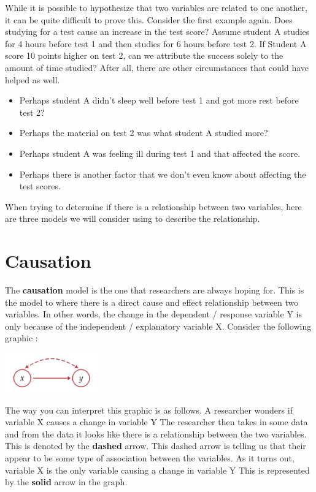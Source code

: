 \documentclass[
  letterpaper,
  DIV=11,
  numbers=noendperiod]{scrreprt}
\providecommand{\tightlist}{%
  \setlength{\itemsep}{0pt}\setlength{\parskip}{0pt}}\usepackage{longtable,booktabs,array}
\begin{document}
While it is possible to hypothesize that two variables are related to
one another, it can be quite difficult to prove this. Consider the first
example again. Does studying for a test cause an increase in the test
score? Assume student A studies for 4 hours before test 1 and then
studies for 6 hours before test 2. If Student A score 10 points higher
on test 2, can we attribute the success solely to the amount of time
studied? After all, there are other circumstances that could have helped
as well.

\begin{itemize}
\tightlist
\item
  Perhaps student A didn't sleep well before test 1 and got more rest
  before test 2?
\item
  Perhaps the material on test 2 was what student A studied more?
\item
  Perhaps student A was feeling ill during test 1 and that affected the
  score.
\item
  Perhaps there is another factor that we don't even know about
  affecting the test scores.
\end{itemize}

When trying to determine if there is a relationship between two
variables, here are three models we will consider using to describe the
relationship.

\section*{Causation}\label{causation}


The \textbf{causation} model is the one that researchers are always
hoping for. This is the model to where there is a direct cause and
effect relationship between two variables. In other words, the change in
the dependent / response variable Y is only because of the independent /
explanatory variable X. Consider the following graphic :

\includegraphics[width=0.3\textwidth,height=\textheight]{./images/IDV_1.jpg}

The way you can interpret this graphic is as follows. A researcher
wonders if variable X causes a change in variable Y The researcher then
takes in some data and from the data it looks like there is a
relationship between the two variables. This is denoted by the
\textbf{dashed} arrow. This dashed arrow is telling us that their appear
to be some type of association between the variables. As it turns out,
variable X is the only variable causing a change in variable Y This is
represented by the \textbf{solid} arrow in the graph.
\end{document}
